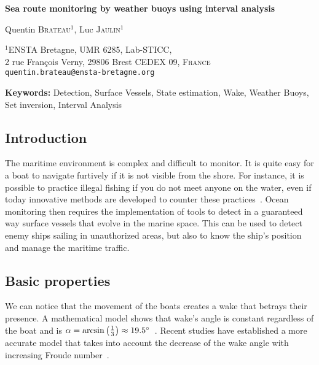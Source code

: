 \documentclass[14pt, a4paper]{article}
\begin{document}
	\begin{center}

		{\Large\bf Sea route monitoring by weather buoys using interval analysis}

		\vspace*{0.8cm}

		{\large Quentin \textsc{Brateau}$^{1}$, Luc \textsc{Jaulin}$^{1}$}

		\bigskip

		{\small $^{1}$ENSTA Bretagne, UMR 6285, Lab-STICC, \\
		2 rue François Verny, 29806 Brest CEDEX 09, \textsc{France} \\
		\texttt{quentin.brateau@ensta-bretagne.org}
		}

	\end{center}

	\bigskip

	{\noindent\bf Keywords:} Detection, Surface Vessels, State estimation, Wake, Weather Buoys, Set inversion, Interval Analysis

	\subsection*{Introduction}
		The maritime environment is complex and difficult to monitor. It is quite easy for a boat to navigate furtively if it is not visible from the shore. For instance, it is possible to practice illegal fishing if you do not meet anyone on the water, even if today innovative methods are developed to counter these practices~\cite{doi:10.1073/pnas.1915499117}. Ocean monitoring then requires the implementation of tools to detect in a guaranteed way surface vessels that evolve in the marine space. This can be used to detect enemy ships sailing in unauthorized areas, but also to know the ship's position and manage the maritime traffic.

	\subsection*{Basic properties}
		We can notice that the movement of the boats creates a wake that betrays their presence. A mathematical model shows that wake's angle is constant regardless of the boat and is $\alpha = \arcsin\left(\frac{1}{3}\right) \approx 19.5 \degree$~\cite{thomson1887ship, stoker1992water}. Recent studies have established a more accurate model that takes into account the decrease of the wake angle with increasing Froude number~\cite{Rabaud_2013}.
		
\end{document}

